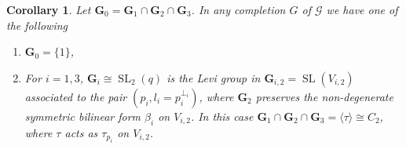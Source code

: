 \documentclass[12pt]{amsart}
\newtheorem{corollary}[theorem]{Corollary}
\theoremstyle{definition}
\newcommand{\bpf}{\noindent{\bf Proof}\hspace{7pt}}
\newcommand{\epf}{\qed}
\newcommand{\bco}{\begin{corollary}}
\newcommand{\eco}{\end{corollary}}
\DeclareMathOperator{\SL}{SL}
\DeclareMathOperator{\SO}{SO}
\renewcommand{\qed}{\hfill $\square$}
\newcommand{\amgrpG}{{\mathbf{G}}}
\newcommand{\compG}{{{G}}}
\newcommand{\amG}{{\mathscr{G}}}
\begin{document}
\bco Let $\amgrpG_0=\amgrpG_1\cap\amgrpG_2\cap\amgrpG_3$.
In any completion $\compG$ of $\amG$ we have one of the following
\begin{enumerate}
\item $\amgrpG_0=\{1\}$,
\item For $i=1,3$, $\amgrpG_i\cong\SL_2(q)$ is the Levi group in $\amgrpG_{i,2}=\SL(V_{i,2})$ associated to the pair $(p_i, l_i=p_i^{\perp_i})$, where $\amgrpG_2$ preserves the non-degenerate symmetric bilinear form $\beta_i$ on $V_{i,2}$.
In this case $\amgrpG_1\cap\amgrpG_2\cap\amgrpG_3=\langle\tau\rangle\cong C_2$, where
 $\tau$ acts as $\tau_{p_i}$ on $V_{i,2}$.
\end{enumerate}
\eco
%
%
\end{document}
